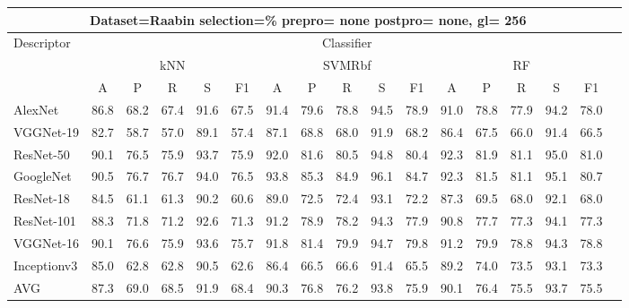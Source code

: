 \documentclass[12pt,italian]{article}
\begin{document}
\begin{tiny}
\begin{longtable}{lcccccccccccccccc}
\toprule
\multicolumn{16}{c}{Dataset=Raabin selection=\% prepro= none postpro= none, gl= 256} \\ 
\toprule
Descriptor & \multicolumn{15}{c}{Classifier} \\ 
& \multicolumn{5}{c}{kNN} & \multicolumn{5}{c}{SVMRbf} & \multicolumn{5}{c}{RF} \\ 
& A & P & R & S & F1 & A & P & R & S & F1 & A & P & R & S & F1 \\ 
\midrule
AlexNet & 86.8 & 68.2 & 67.4 & 91.6 & 67.5 & 91.4 & 79.6 & 78.8 & 94.5 & 78.9 & 91.0 & 78.8 & 77.9 & 94.2 & 78.0 \\ 
VGGNet-19 & 82.7 & 58.7 & 57.0 & 89.1 & 57.4 & 87.1 & 68.8 & 68.0 & 91.9 & 68.2 & 86.4 & 67.5 & 66.0 & 91.4 & 66.5 \\ 
ResNet-50 & 90.1 & 76.5 & 75.9 & 93.7 & 75.9 & 92.0 & 81.6 & 80.5 & 94.8 & 80.4 & 92.3 & 81.9 & 81.1 & 95.0 & 81.0 \\ 
GoogleNet & 90.5 & 76.7 & 76.7 & 94.0 & 76.5 & 93.8 & 85.3 & 84.9 & 96.1 & 84.7 & 92.3 & 81.5 & 81.1 & 95.1 & 80.7 \\ 
ResNet-18 & 84.5 & 61.1 & 61.3 & 90.2 & 60.6 & 89.0 & 72.5 & 72.4 & 93.1 & 72.2 & 87.3 & 69.5 & 68.0 & 92.1 & 68.0 \\ 
ResNet-101 & 88.3 & 71.8 & 71.2 & 92.6 & 71.3 & 91.2 & 78.9 & 78.2 & 94.3 & 77.9 & 90.8 & 77.7 & 77.3 & 94.1 & 77.3 \\ 
VGGNet-16 & 90.1 & 76.6 & 75.9 & 93.6 & 75.7 & 91.8 & 81.4 & 79.9 & 94.7 & 79.8 & 91.2 & 79.9 & 78.8 & 94.3 & 78.8 \\ 
Inceptionv3 & 85.0 & 62.8 & 62.8 & 90.5 & 62.6 & 86.4 & 66.5 & 66.6 & 91.4 & 65.5 & 89.2 & 74.0 & 73.5 & 93.1 & 73.3 \\ 
\hline
AVG & 87.3 & 69.0 & 68.5 & 91.9 & 68.4 & 90.3 & 76.8 & 76.2 & 93.8 & 75.9 & 90.1 & 76.4 & 75.5 & 93.7 & 75.5 \\ 
\hline
\bottomrule
\end{longtable} 

 \pagebreak 
\end{tiny} 
 
\end{document}
